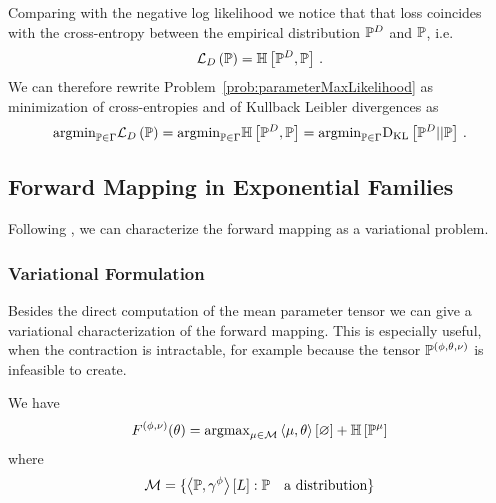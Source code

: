 Comparing with the negative log likelihood we notice that that loss coincides with the cross-entropy between the empirical distribution $\mathbb{P}^{D}$ and $\mathbb{P}$, i.e.
	\[ \mathcal{L}_{D}\left(\mathbb{P}\right) = \mathbb{H}\left[\mathbb{P}^{D},\mathbb{P}\right] \, . \]
We can therefore rewrite Problem~\ref{prob:parameterMaxLikelihood} as minimization of cross-entropies and of Kullback Leibler divergences as
\begin{align*}
	\mathrm{argmin}_{\mathbb{P}\in\Gamma} \mathcal{L}_{D}\left(\mathbb{P}\right) 
	= \mathrm{argmin}_{\mathbb{P}\in\Gamma} \mathbb{H}\left[\mathbb{P}^{D},\mathbb{P}\right] 
	= \mathrm{argmin}_{\mathbb{P}\in\Gamma} \mathrm{D}_{\mathrm{KL}}\left[ \mathbb{P}^{D} || \mathbb{P} \right] \, .
\end{align*}
	








\subsection{Forward Mapping in Exponential Families} 


Following \cite{wainwright_graphical_2008}, we can characterize the forward mapping as a variational problem.



\subsubsection{Variational Formulation}

Besides the direct computation of the mean parameter tensor we can give a variational characterization of the forward mapping.
This is especially useful, when the contraction is intractable, for example because the tensor $\mathbb{P}^{(\phi,\theta,\nu)}$ is infeasible to create.

We have
\begin{align*}
	F^{(\phi,\nu)}(\theta)  = \mathrm{argmax}_{\mu\in\mathcal{M}}  \left\langle \mu,\theta\right\rangle \left[ \varnothing \right] + \mathbb{H}\left[\mathbb{P}^{\mu}\right] 
\end{align*}
where 
\begin{align*}
	 \mathcal{M} = \{  \left\langle \mathbb{P},\gamma^{\phi}\right\rangle \left[ L \right]  :  \mathbb{P} \quad \text{a distribution} \}
\end{align*}

